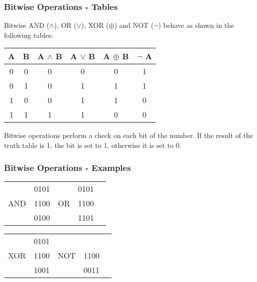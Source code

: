 \documentclass{beamer}
\begin{document}
\begin{frame}
  \frametitle{Bitwise Operations - Tables}
  Bitwise AND ($\land$), OR ($\lor$), XOR ($\oplus$) and NOT ($\lnot$) behave as shown in the following tables:
  \begin{table}
    \centering
    \begin{tabular}{c|c|c|c|c|c}
    A & B & A $\land$ B & A $\lor$ B & A $\oplus$ B & $\lnot$ A \\
    \hline
    0 & 0 & 0 & 0 & 0 & 1 \\
    0 & 1 & 0 & 1 & 1 & 1 \\
    1 & 0 & 0 & 1 & 1 & 0 \\
    1 & 1 & 1 & 1 & 0 & 0 \\
    \end{tabular}
  \end{table}
Bitwise operations perform a check on each bit of the number. If the result of the truth table is 1, the bit is set to 1, otherwise it is set to 0.\\
\end{frame}
\begin{frame}
  \frametitle{Bitwise Operations - Examples}
  \begin{table}[h]
    \centering
    \begin{tabular}{ccccc}
        & 0101   & \hspace{2cm}   & 0101\\
    AND & 1100   & \hspace{2cm} OR& 1100\\
    \cline{2-2}  \cline{4-4}
        & 0100   & \hspace{2cm}   & 1101\\
    \end{tabular}
    \end{table}
    \begin{table}[h]
      \centering
      \begin{tabular}{ccccc}
          & 0101   & \hspace{2cm}    & \\
      XOR & 1100   & \hspace{2cm} NOT& 1100\\
      \cline{2-2}  \cline{4-4}
          & 1001   & \hspace{2cm}   & 0011\\
      \end{tabular}
      \end{table}
\end{frame}
\end{document}
